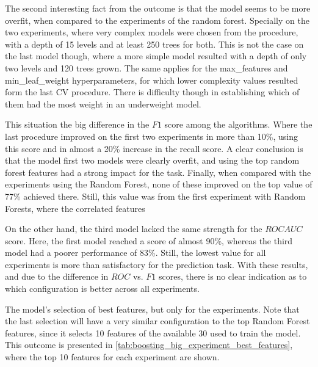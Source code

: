 The second interesting fact from the outcome is that the model seems to be more overfit, when compared to the experiments of the random forest.
Specially on the two experiments, where very complex models were chosen from the procedure, with a depth of 15 levels and at least 250 trees for both.
This is not the case on the last model though, where a more simple model resulted with a depth of only two levels and 120 trees grown.
The same applies for the max\_features and min\_leaf\_weight hyperparameters, for which lower complexity values resulted form the last CV procedure.
There is difficulty though in establishing which of them had the most weight in an underweight model.

This situation the big difference in the $F1$ score among the algorithms.
Where the last procedure improved on the first two experiments in more than 10\%, using this score and in almost a 20\% increase in the recall score.
A clear conclusion is that the model first two models were clearly overfit, and using the top random forest features had a strong impact for the task.
Finally, when compared with the experiments using the Random Forest, none of these improved on the top value of 77\% achieved there. 
Still, this value was from the first experiment with Random Forests, where the correlated features


On the other hand, the third model lacked the same strength for the $ROC AUC$ score.
Here, the first model reached a score of almost 90\%, whereas the third model had a poorer performance of 83\%.
Still, the lowest value for all experiments is more than satisfactory for the prediction task.
With these results, and due to the difference in $ROC$ vs. $F1$ scores, there is no clear indication as to which configuration is better across all experiments.


The model's selection of best features, but only for the experiments.
Note that the last selection will have a very similar configuration to the top Random Forest features, since it selects 10 features of the available 30 used to train the model.
This outcome is presented in \cref{tab:boosting_big_experiment_best_features}, where the top 10 features for each experiment are shown.


